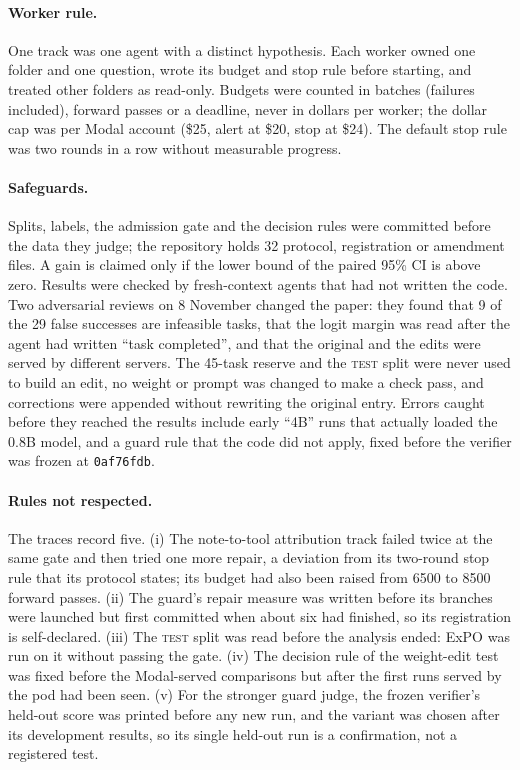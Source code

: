 \paragraph{Worker rule.} One track was one agent with a distinct hypothesis. Each worker owned one folder and one question, wrote its budget and stop rule before starting, and treated other folders as read-only. Budgets were counted in batches (failures included), forward passes or a deadline, never in dollars per worker; the dollar cap was per Modal account (\$25, alert at \$20, stop at \$24). The default stop rule was two rounds in a row without measurable progress. %

\paragraph{Safeguards.} Splits, labels, the admission gate and the decision rules were committed before the data they judge; the repository holds 32 protocol, registration or amendment files. A gain is claimed only if the lower bound of the paired 95\% CI is above zero. Results were checked by fresh-context agents that had not written the code. Two adversarial reviews on 8 November changed the paper: they found that 9 of the 29 false successes are infeasible tasks, that the logit margin was read after the agent had written ``task completed'', and that the original and the edits were served by different servers. The 45-task reserve and the \textsc{test} split were never used to build an edit, no weight or prompt was changed to make a check pass, and corrections were appended without rewriting the original entry. Errors caught before they reached the results include early ``4B'' runs that actually loaded the 0.8B model, and a guard rule that the code did not apply, fixed before the verifier was frozen at \texttt{0af76fdb}. %

\paragraph{Rules not respected.} The traces record five. (i) The note-to-tool attribution track failed twice at the same gate and then tried one more repair, a deviation from its two-round stop rule that its protocol states; its budget had also been raised from 6500 to 8500 forward passes. (ii) The guard's repair measure was written before its branches were launched but first committed when about six had finished, so its registration is self-declared. (iii) The \textsc{test} split was read before the analysis ended: ExPO was run on it without passing the gate. (iv) The decision rule of the weight-edit test was fixed before the Modal-served comparisons but after the first runs served by the pod had been seen. (v) For the stronger guard judge, the frozen verifier's held-out score was printed before any new run, and the variant was chosen after its development results, so its single held-out run is a confirmation, not a registered test. %

